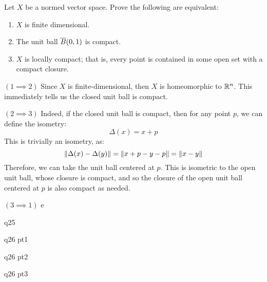 \documentclass{article}
\begin{document}
\newpage
{}

\begin{qu}
    Let $ X $ be a normed vector space. Prove the following are equivalent:
    \begin{enumerate}
        \item $ X $ is finite dimensional.
        \item The unit ball $ \overline{B}(0, 1) $ is compact.
        \item $ X $ is locally compact; that is, every point is contained in some open set with
            a compact closure.
   \end{enumerate}
\end{qu}

\begin{soln}
    $ (1 \implies 2) $
    Since $ X $ is finite-dimensional, then $ X $ is homeomorphic to $ \mathbb{R}^{n} $.
    This immediately tells us the closed unit ball is compact. \npgh

    $ (2 \implies 3) $
    Indeed, if the closed unit ball is compact, then for any point $ p $, we can define
    the isometry:
    \begin{equation*}
        \Delta(x) = x + p
    \end{equation*}
    This is trivially an isometry, as:
    \begin{equation*}
        \|\Delta(x) - \Delta(y)\| = \|x + p - y - p\| = \|x - y\|
    \end{equation*}
    Therefore, we can take the unit ball centered at $ p $.
    This is isometric to the open unit ball, whose closure is compact, and so the closure of
    the open unit ball centered at $ p $ is also compact as needed. \npgh

    $ (3 \implies 1) $
    e
\end{soln}

\newpage
{}

\begin{qu}
    q25
\end{qu}

\newpage
{}

\begin{qu}
    q26 pt1
\end{qu}

\begin{qu}
    q26 pt2
\end{qu}

\begin{qu}
    q26 pt3
\end{qu}
\end{document}
